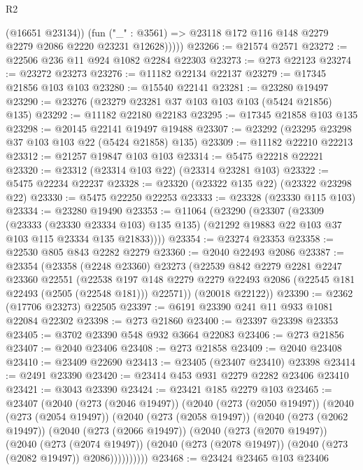 \begin{lexlean}{R2}
\begin{coremodule}
              (@16651 @23134))
            (fun ("_" : @3561) => @23118 @172 @116 @148 @2279 @2279 @2086 @2220 @23231 @12628)))))
@23266 := @21574 @2571
@23272 := @22506 @236 @11 @924 @1082 @2284 @22303
@23273 := @273 @22123
@23274 := @23272 @23273
@23276 := @11182 @22134 @22137
@23279 := @17345 @21856 @103 @103
@23280 := @15540 @22141
@23281 := @23280 @19497
@23290 := @23276 (@23279 @23281 @37 @103 @103 @103 (@5424 @21856) @135)
@23292 := @11182 @22180 @22183
@23295 := @17345 @21858 @103 @135
@23298 := @20145 @22141 @19497 @19488
@23307 := @23292 (@23295 @23298 @37 @103 @103 @22 (@5424 @21858) @135)
@23309 := @11182 @22210 @22213
@23312 := @21257 @19847 @103 @103
@23314 := @5475 @22218 @22221
@23320 := @23312 (@23314 @103 @22) (@23314 @23281 @103)
@23322 := @5475 @22234 @22237
@23328 := @23320 (@23322 @135 @22) (@23322 @23298 @22)
@23330 := @5475 @22250 @22253
@23333 := @23328 (@23330 @115 @103)
@23334 := @23280 @19490
@23353 := @11064
    (@23290
      (@23307
        (@23309
          (@23333 (@23330 @23334 @103) @135 @135)
          (@21292 @19883 @22 @103 @37 @103 @115 @23334 @135 @21833))))
@23354 := @23274 @23353
@23358 := @22530 @805 @843 @2282 @2279
@23360 := @2040 @22493 @2086
@23387 := @23354
    (@23358
      (@2248 @23360)
      @23273
      (@22539
        @842
        @2279
        @2281
        @2247
        @23360
        @22551
        (@22538
          @197
          @148
          @2279
          @2279
          @22493
          @2086
          (@22545 @181 @22493 (@2505 (@22548 @181)))
          @22571))
      (@20018 @22122))
@23390 := @2362 (@17706 @23273) @22505
@23397 := @6191 @23390 @241 @11 @933 @1081 @22084 @22302
@23398 := @273 @21860
@23400 := @23397 @23398 @23353
@23405 := @3702 @23390 @548 @932 @3664 @22083
@23406 := @273 @21856
@23407 := @2040 @23406
@23408 := @273 @21858
@23409 := @2040 @23408
@23410 := @23409 @22690
@23413 := @23405 (@23407 @23410) @23398
@23414 := @2491 @23390
@23420 := @23414 @453 @931 @2279 @2282 @23406 @23410
@23421 := @3043 @23390
@23424 := @23421 @185 @2279 @103
@23465 := @23407
    (@2040
      (@273 (@2046 @19497))
      (@2040
        (@273 (@2050 @19497))
        (@2040
          (@273 (@2054 @19497))
          (@2040
            (@273 (@2058 @19497))
            (@2040
              (@273 (@2062 @19497))
              (@2040
                (@273 (@2066 @19497))
                (@2040
                  (@273 (@2070 @19497))
                  (@2040
                    (@273 (@2074 @19497))
                    (@2040 (@273 (@2078 @19497)) (@2040 (@273 (@2082 @19497)) @2086))))))))))
@23468 := @23424 @23465 @103 @23406

\end{coremodule}
\end{lexlean}
